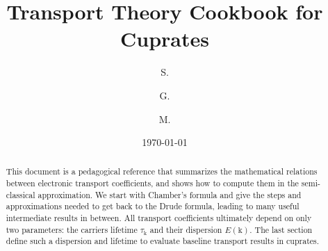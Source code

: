 \documentclass[notitlepage,11pt,nofootinbib]{revtex4-1}
\renewcommand{\vec}[1]{\bm{\mathrm{#1}}}
\begin{document}
\title{Transport Theory Cookbook for Cuprates}
\author{S. }
\author{G. }
\author{M. }
\date{\today}

\begin{abstract}
This document is a pedagogical reference that summarizes the mathematical relations between electronic transport coefficients, and shows how to compute them in the semi-classical approximation. We start with Chamber's formula and give the steps and approximations needed to get back to the Drude formula, leading to many useful intermediate results in between. All transport coefficients ultimately depend on only two parameters: the carriers lifetime $\tau_{\vec k}$ and their dispersion $E(\vec k)$. The last section define such a dispersion and lifetime to evaluate baseline transport results in cuprates.
\end{abstract}

\maketitle
\vspace{-0.5cm}
\tableofcontents
\end{document}
